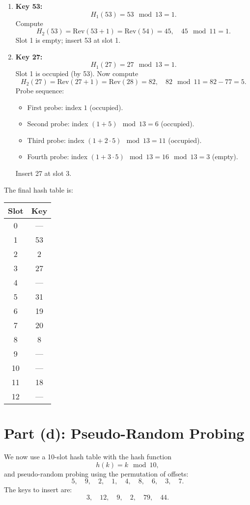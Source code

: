 \documentclass{article}
\begin{document}
\begin{enumerate}[label=\textbf{Step \arabic*:}, leftmargin=1.8cm]
    \item \textbf{Key 53:} 
    \[
    H_1(53)=53 \mod 13 = 1.
    \]
    Compute 
    \[
    H_2(53)=\text{Rev}(53+1)=\text{Rev}(54)=45,\quad 45 \mod 11 = 1.
    \]
    Slot 1 is empty; insert 53 at slot 1.
    
    \item \textbf{Key 27:} 
    \[
    H_1(27)=27 \mod 13 = 1.
    \]
    Slot 1 is occupied (by 53). Now compute 
    \[
    H_2(27)=\text{Rev}(27+1)=\text{Rev}(28)=82,\quad 82 \mod 11 = 82-77=5.
    \]
    Probe sequence:
    \begin{itemize}
        \item First probe: index \(1\) (occupied).
        \item Second probe: index \( (1+5) \mod 13 = 6\) (occupied).
        \item Third probe: index \( (1+2\cdot5) \mod 13 = 11\) (occupied).
        \item Fourth probe: index \( (1+3\cdot5) \mod 13 = 16 \mod 13 = 3\) (empty).
    \end{itemize}
    Insert 27 at slot 3.
\end{enumerate}

The final hash table is:

\bigskip
\begin{center}
\begin{tabular}{c|c}
\textbf{Slot} & \textbf{Key} \\ \midrule
0  & --- \\
1  & 53 \\
2  & 2 \\
3  & 27 \\
4  & --- \\
5  & 31 \\
6  & 19 \\
7  & 20 \\
8  & 8 \\
9  & --- \\
10 & --- \\
11 & 18 \\
12 & --- \\
\end{tabular}
\end{center}
\bigskip

\section*{Part (d): Pseudo-Random Probing}

We now use a 10-slot hash table with the hash function 
\[
h(k)= k \mod 10,
\]
and pseudo-random probing using the permutation of offsets:
\[
5,\quad 9,\quad 2,\quad 1,\quad 4,\quad 8,\quad 6,\quad 3,\quad 7.
\]
The keys to insert are:
\[
3,\quad 12,\quad 9,\quad 2,\quad 79,\quad 44.
\]
\end{document}
